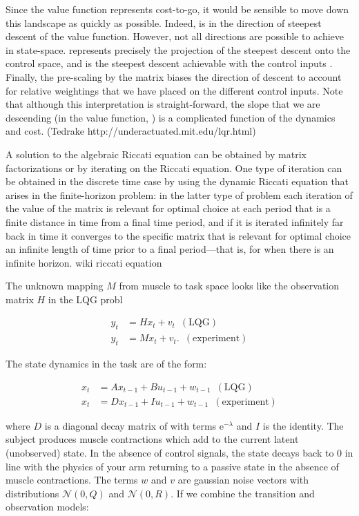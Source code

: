 \documentclass[../main.tex]{subfiles}
\begin{document}
{{{ Since the value function represents cost-to-go, it would be sensible to move down this landscape as quickly as possible. Indeed, is in the direction of steepest descent of the value function. However, not all directions are possible to achieve in state-space. represents precisely the projection of the steepest descent onto the control space, and is the steepest descent achievable with the control inputs . Finally, the pre-scaling by the matrix biases the direction of descent to account for relative weightings that we have placed on the different control inputs. Note that although this interpretation is straight-forward, the slope that we are descending (in the value function, ) is a complicated function of the dynamics and cost. (Tedrake http://underactuated.mit.edu/lqr.html)

 A solution to the algebraic Riccati equation can be obtained by matrix factorizations or by iterating on the Riccati equation. One type of iteration can be obtained in the discrete time case by using the dynamic Riccati equation that arises in the finite-horizon problem: in the latter type of problem each iteration of the value of the matrix is relevant for optimal choice at each period that is a finite distance in time from a final time period, and if it is iterated infinitely far back in time it converges to the specific matrix that is relevant for optimal choice an infinite length of time prior to a final period—that is, for when there is an infinite horizon.  wiki riccati equation

 The unknown mapping $M$ from muscle to task space looks like the observation matrix $H$ in the LQG probl

\begin{align*}
y_t &= Hx_t + v_t\,\,\,(\mathrm{LQG}) \\
y_t &= Mx_t + v_t. \,\,\,(\mathrm{experiment})
\end{align*}

The state dynamics in the task are of the form:

\begin{align*}
x_{t} &= Ax_{t-1} + Bu_{t-1} + w_{t-1} \,\,\,(\mathrm{LQG}) \\
x_t &= Dx_{t-1} + Iu_{t-1} + w_{t-1} \,\,\,(\mathrm{experiment})
\end{align*}

where $D$ is a diagonal decay matrix of with terms $\mathrm{e}^{-\lambda}$ and $I$ is the identity. The subject produces muscle contractions which add to the current latent (unobserved) state. In the absence of control signals, the state decays back to $0$ in line with the physics of your arm returning to a passive state in the absence of muscle contractions. The terms $w$ and $v$ are gaussian noise vectors with distributions $\mathcal{N}(0,Q)$ and $\mathcal{N}(0,R)$. If we combine the transition and observation models:

}}}
\end{document}
